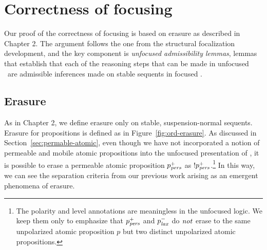 \section{Correctness of focusing}
\label{sec:ord-correctness}

Our proof of the correctness of focusing is based on erasure as
described in Chapter 2. The argument follows the one from the
structural focalization development, and the key component is {\it
  unfocused admissibility lemmas}, lemmas that establish that each of
the reasoning steps that can be made in unfocused \ollll~are
admissible inferences made on stable sequents in focused \ollll.



\subsection{Erasure}

As in Chapter 2, we define erasure only on stable, suspension-normal
sequents. Erasure for propositions is defined as in
Figure~\ref{fig:ord-erasure}. As discussed in
Section~\ref{sec:permable-atomic}, even though we have not
incorporated a notion of permeable and mobile atomic propositions into
the unfocused presentation of \ollll, it is possible to erase a
permeable atomic proposition $p^+_{\it pers}$ as
${!}p^+_{\it pers}$.\footnote{The polarity and level annotations are
  meaningless in the unfocused logic. We keep them only to emphasize
  that $p^+_{\it pers}$ and $p^-_{\it lax}$ do $\it not$ erase to the same
  unpolarized atomic proposition $p$ but two distinct unpolarized
  atomic propositions.}  In this way, we can see the separation
criteria from our previous work
\cite{simmons08linear,pfenning09substructural} arising as an emergent
phenomena of erasure.

